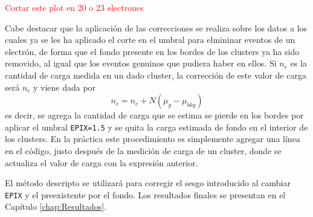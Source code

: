 \textcolor{red}{Cortar este plot en 20 o 23 electrones}

Cabe destacar que la aplicación de las correcciones se realiza sobre los datos a los cuales ya se les ha aplicado el corte en el umbral para elmininar eventos de un electrón, de forma que el fondo presente en los bordes de los clusters ya ha sido removido, al igual que los eventos genuinos que pudiera haber en ellos. Si $n_{e}$ es la cantidad de carga medida en un dado cluster, la corrección de este valor de carga será $n_{c}$ y viene dada por
\begin{equation*}
    n_{c} = n_{e} + N(\mu_{g} - \mu_{bkg})
\end{equation*}
es decir, se agrega la cantidad de carga que se estima se pierde en los bordes por aplicar el umbral \verb|EPIX=1.5| y se quita la carga estimada de fondo en el interior de los clusters. En la práctica este procedimiento es simplemente agregar una línea en el código, justo después de la medición de carga de un cluster, donde se actualiza el valor de carga con la expresión anterior.

El método descripto se utilizará para corregir el sesgo introducido al cambiar \verb|EPIX| y el preexistente por el fondo. Los resultados finales se presentan en el Capítulo \ref{chap:Resultados}.